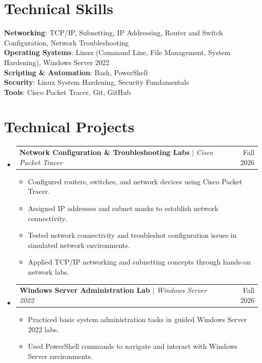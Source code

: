 \documentclass[letterpaper,11pt]{article}
\makeatletter
\newcommand{\resumeItem}[1]{
  \item\small{
    {#1 \vspace{-2pt}}
  }
}
\newcommand{\resumeProjectHeading}[2]{
    \item
    \begin{tabular*}{0.97\textwidth}{l@{\extracolsep{\fill}}r}
      \small#1 & #2 \\
    \end{tabular*}\vspace{-7pt}
}
\newcommand{\resumeSubHeadingListStart}{\begin{itemize}[leftmargin=0.15in, label={}]}
\newcommand{\resumeSubHeadingListEnd}{\end{itemize}}
\newcommand{\resumeItemListStart}{\begin{itemize}}
\newcommand{\resumeItemListEnd}{\end{itemize}\vspace{-5pt}}
\makeatother
\begin{document}
\section{Technical Skills}
 \begin{itemize}[leftmargin=0.15in, label={}]
    \small{\item{
     \textbf{Networking}{: TCP/IP, Subnetting, IP Addressing, Router and Switch Configuration, Network Troubleshooting} \\
     \textbf{Operating Systems}{: Linux (Command Line, File Management, System Hardening), Windows Server 2022} \\
     \textbf{Scripting \& Automation}{: Bash, PowerShell} \\
     \textbf{Security}{: Linux System Hardening, Security Fundamentals} \\
     \textbf{Tools}{: Cisco Packet Tracer, Git, GitHub}
    }}
 \end{itemize}

\section{Technical Projects}
    \resumeSubHeadingListStart
      \resumeProjectHeading
          {\textbf{Network Configuration \& Troubleshooting Labs} $|$ \emph{Cisco Packet Tracer}}{Fall 2026}
          \resumeItemListStart
            \resumeItem{Configured routers, switches, and network devices using Cisco Packet Tracer.}
            \resumeItem{Assigned IP addresses and subnet masks to establish network connectivity.}
            \resumeItem{Tested network connectivity and troubleshot configuration issues in simulated network environments.}
            \resumeItem{Applied TCP/IP networking and subnetting concepts through hands-on network labs.}
          \resumeItemListEnd
      \resumeProjectHeading
          {\textbf{Windows Server Administration Lab} $|$ \emph{Windows Server 2022}}{Fall 2026}
          \resumeItemListStart
            \resumeItem{Practiced basic system administration tasks in guided Windows Server 2022 labs.}
            \resumeItem{Used PowerShell commands to navigate and interact with Windows Server environments.}
          \resumeItemListEnd
    \resumeSubHeadingListEnd

\end{document}
